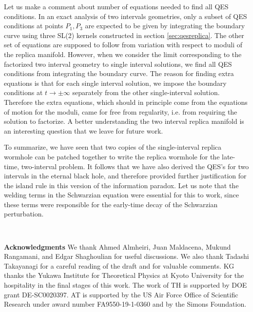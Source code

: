 \documentclass[12pt]{article}
\numberwithin{equation}{section}
\begin{document}
\begin{spacing}{1.1}
Let us make a comment about  number of equations needed to find all QES conditions. In an exact analysis of two intervals geometries, only a subset of QES conditions at points $P_1, P_3$ are expected to be given by integrating the boundary curve using three SL(2) kernels constructed in section \ref{sec:qesreplica}. The other set of equations are supposed to follow from variation with respect to moduli of the replica manifold. However, when we consider the limit corresponding to the factorized two interval geometry to single interval solutions, we find all QES conditions from integrating the boundary curve. The reason for finding extra equations is that for each single interval solution, we impose the boundary conditions at $t \to \pm \infty$ separately from the other single-interval solution. Therefore the extra equations, which should in principle come from the equations of motion for the moduli, came for free from regularity, i.e. from requiring the solution to factorize. 
 A better understanding the two interval replica manifold is an interesting question that we leave for future work.

To summarize, we have seen that two copies of the single-interval replica wormhole can be patched together to write the replica wormhole for the late-time, two-interval problem. It follows that we have also derived the QES's for two intervals in the eternal black hole, and therefore provided further justification for the island rule in this version of the information paradox. Let us note that the welding terms in the Schwarzian equation were essential for this to work, since these terms were responsible for the early-time decay of the Schwarzian perturbation.


\ \\

\bigskip

\textbf{Acknowledgments}
We thank Ahmed Almheiri, Juan Maldacena, Mukund Rangamani, and Edgar Shaghoulian for useful discussions. We also thank Tadashi Takayanagi for a careful reading of the draft and for valuable comments. KG thanks the Yukawa Institute for Theoretical Physics at Kyoto University for the hospitality in the final stages of this work. The work of TH is supported by  DOE grant DE-SC0020397. AT is supported by the US Air Force Office of Scientific Research under award number FA9550-19-1-0360 and by the Simons Foundation. 
 
 \ \\
 \bigskip
 


\end{spacing}
\end{document}
